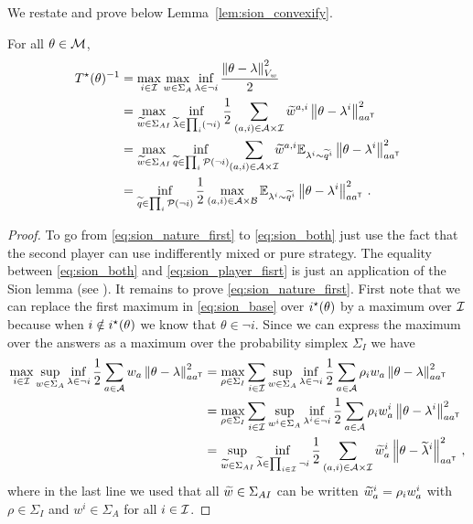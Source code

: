 We restate and prove below Lemma~\ref{lem:sion_convexify}.
\begin{lemma}
  \label{lem:sion_convexify_extended} For all $\theta \in\mathcal{M}$,
\begin{align}
  T^{\star}(\theta)^{-1} &= \max_{i\in \mathcal{I}} \max_{w \in \Sigma_A} \inf_{\lambda\in \neg i} \frac{\left\lVert\theta - \lambda\right\rVert_{V_w}^2}{2}\label{eq:sion_base}\\
  &=\max_{\widetilde{w} \in \Sigma_{AI}} \inf_{\widetilde{\lambda}\in \prod_i (\neg i) }\frac{1}{2} \sum_{(a,i)\in\mathcal{A}\times\mathcal{I}}\widetilde{w}^{a,i}\left\lVert\theta - \lambda^i\right\rVert_{aa^{\mathsf{\scriptscriptstyle T}}}^2\label{eq:sion_nature_first}\\
  & = \max_{\widetilde{w} \in \Sigma_{AI}}\inf_{\widetilde{q}\in \prod_i\mathcal{P}(\neg i) }\!\sum_{(a,i)\in\mathcal{A}\times\mathcal{I}}\!\!\!\widetilde{w}^{a,i}\mathbb{E}_{\lambda^i\sim \widetilde{q}^i}\left\lVert\theta - \lambda^i\right\rVert_{aa^{\mathsf{\scriptscriptstyle T}}}^2 \label{eq:sion_both}\\
  &= \inf_{\widetilde{q}\in \prod_i\mathcal{P}(\neg i) } \frac{1}{2}\max_{(a,i)\in\mathcal{A}\times\mathcal{B}}\mathbb{E}_{\lambda^i\sim \widetilde{q}^i}\left\lVert\theta - \lambda^i\right\rVert_{aa^{\mathsf{\scriptscriptstyle T}}}^2\label{eq:sion_player_fisrt}\,.
\end{align}

\end{lemma}
\begin{proof}
  To go from \eqref{eq:sion_nature_first} to \eqref{eq:sion_both} just use the fact that the second player can use indifferently mixed or pure strategy. The equality between \eqref{eq:sion_both} and \eqref{eq:sion_player_fisrt} is just an application of the Sion lemma (see \citealt{degenne2019pure}).
  It remains to prove \eqref{eq:sion_nature_first}. First note that we can replace the first maximum in \eqref{eq:sion_base} over $i^\star(\theta)$ by a maximum over $\mathcal{I}$ because when $i\notin i^\star(\theta)$ we know that $\theta\in \neg i$. Since we can express the maximum over the answers as a maximum over the probability simplex $\Sigma_I$ we have
\begin{align*}
    \max_{i\in \mathcal{I}} \sup_{w \in \Sigma_A} \inf_{\lambda\in \neg i} \frac{1}{2}\sum_{a\in\mathcal{A}} w_a \left\lVert\theta - \lambda\right\rVert_{aa^{\mathsf{\scriptscriptstyle T}}}^2 &= \max_{\rho \in \Sigma_I} \sum_{i\in\mathcal{I}}\sup_{w \in \Sigma_A} \inf_{\lambda\in \neg i} \frac{1}{2}\sum_{a\in\mathcal{A}} \rho_i w_a\left\lVert\theta - \lambda\right\rVert_{aa^{\mathsf{\scriptscriptstyle T}}}^2\\
     &= \max_{\rho\in \Sigma_I} \sum_{i\in \mathcal{I}} \sup_{w^i \in \Sigma_A} \inf_{\lambda^i\in \neg i}\frac{1}{2} \sum_{a\in\mathcal{A}} \rho_i w_a^i\left\lVert\theta - \lambda^i\right\rVert_{aa^{\mathsf{\scriptscriptstyle T}}}^2\\
     &= \sup_{\widetilde{w} \in \Sigma_{A I}} \inf_{\widetilde{\lambda} \in \prod_{i\in\mathcal{I}}\neg i} \frac{1}{2}\sum_{(a,i)\in \mathcal{A}\times\mathcal{I}}  \widetilde{w}_a^i \left\lVert\theta - \widetilde{\lambda}^i\right\rVert_{aa^{\mathsf{\scriptscriptstyle T}}}^2\,,
\end{align*}
 where in the last line we used that all $\widetilde{w} \in \Sigma_{A I}$ can be written $\widetilde{w}_a^i = \rho_i w_a^i $ with $\rho \in \Sigma_I$ and $w^i \in \Sigma_A$ for all $i \in \mathcal{I}$.
\end{proof}
